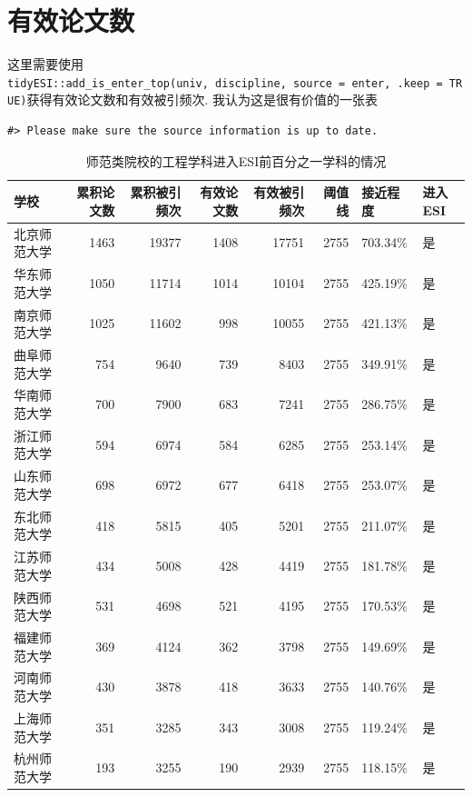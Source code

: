 \documentclass[cn, 11pt, fancy, hide]{elegantbook}
\begin{document}
\hypertarget{ux6709ux6548ux8bbaux6587ux6570}{%
\section{有效论文数}\label{ux6709ux6548ux8bbaux6587ux6570}}

这里需要使用
\texttt{tidyESI::add\_is\_enter\_top(univ,\ discipline,\ source\ =\ enter,\ .keep\ =\ TRUE)}获得有效论文数和有效被引频次. 我认为这是很有价值的一张表

\begin{verbatim}
#> Please make sure the source information is up to date.
\end{verbatim}

\begin{table}[!h]

\caption{\label{tab:unnamed-chunk-20}师范类院校的工程学科进入ESI前百分之一学科的情况}
\centering
\begin{tabular}[t]{lrrrrrll}
\toprule
学校 & 累积论文数 & 累积被引频次 & 有效论文数 & 有效被引频次 & 阈值线 & 接近程度 & 进入ESI\\
\midrule
北京师范大学 & 1463 & 19377 & 1408 & 17751 & 2755 & 703.34\% & 是\\
华东师范大学 & 1050 & 11714 & 1014 & 10104 & 2755 & 425.19\% & 是\\
南京师范大学 & 1025 & 11602 & 998 & 10055 & 2755 & 421.13\% & 是\\
曲阜师范大学 & 754 & 9640 & 739 & 8403 & 2755 & 349.91\% & 是\\
华南师范大学 & 700 & 7900 & 683 & 7241 & 2755 & 286.75\% & 是\\
\addlinespace
浙江师范大学 & 594 & 6974 & 584 & 6285 & 2755 & 253.14\% & 是\\
山东师范大学 & 698 & 6972 & 677 & 6418 & 2755 & 253.07\% & 是\\
东北师范大学 & 418 & 5815 & 405 & 5201 & 2755 & 211.07\% & 是\\
江苏师范大学 & 434 & 5008 & 428 & 4419 & 2755 & 181.78\% & 是\\
陕西师范大学 & 531 & 4698 & 521 & 4195 & 2755 & 170.53\% & 是\\
\addlinespace
福建师范大学 & 369 & 4124 & 362 & 3798 & 2755 & 149.69\% & 是\\
河南师范大学 & 430 & 3878 & 418 & 3633 & 2755 & 140.76\% & 是\\
上海师范大学 & 351 & 3285 & 343 & 3008 & 2755 & 119.24\% & 是\\
杭州师范大学 & 193 & 3255 & 190 & 2939 & 2755 & 118.15\% & 是\\

\end{tabular}
\end{table}
\end{document}
